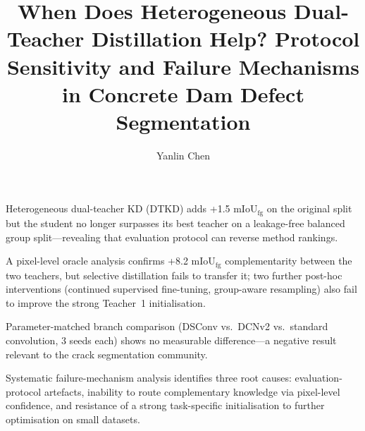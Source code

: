 \documentclass[review,authoryear]{elsarticle}
\begin{document}
\begin{frontmatter}

\title{When Does Heterogeneous Dual-Teacher Distillation Help? Protocol Sensitivity and Failure Mechanisms in Concrete Dam Defect Segmentation}

\author[inst1]{Yanlin Chen}
\address[inst1]{College of Graduate and Professional Studies, Trine University, Angola, IN 46703, USA}

\begin{highlights}
\item Heterogeneous dual-teacher KD (DTKD) adds +1.5 mIoU$_{\text{fg}}$ on the original split but the student no longer surpasses its best teacher on a leakage-free balanced group split---revealing that evaluation protocol can reverse method rankings.
\item A pixel-level oracle analysis confirms +8.2 mIoU$_{\text{fg}}$ complementarity between the two teachers, but selective distillation fails to transfer it; two further post-hoc interventions (continued supervised fine-tuning, group-aware resampling) also fail to improve the strong Teacher~1 initialisation.
\item Parameter-matched branch comparison (DSConv vs.\ DCNv2 vs.\ standard convolution, 3 seeds each) shows no measurable difference---a negative result relevant to the crack segmentation community.
\item Systematic failure-mechanism analysis identifies three root causes: evaluation-protocol artefacts, inability to route complementary knowledge via pixel-level confidence, and resistance of a strong task-specific initialisation to further optimisation on small datasets.
\end{highlights}


\end{frontmatter}
\end{document}
